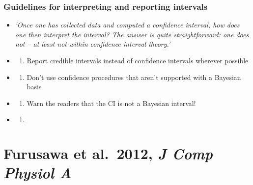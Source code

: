 \documentclass[
]{book}
\providecommand{\tightlist}{%
  \setlength{\itemsep}{0pt}\setlength{\parskip}{0pt}}
\begin{document}
\hypertarget{guidelines-for-interpreting-and-reporting-intervals}{%
\subsection{Guidelines for interpreting and reporting intervals}\label{guidelines-for-interpreting-and-reporting-intervals}}

\begin{itemize}
\item
  \emph{`Once one has collected data and computed a confidence
  interval, how does one then interpret the interval? The
  answer is quite straightforward: one does not -- at least not within confidence interval theory.'}
\item
  \begin{enumerate}
  \def\labelenumi{\arabic{enumi}.}
  \tightlist
  \item
    Report credible intervals instead of confidence intervals wherever possible
  \end{enumerate}
\item
  \begin{enumerate}
  \def\labelenumi{\arabic{enumi}.}
  \setcounter{enumi}{1}
  \tightlist
  \item
    Don't use confidence procedures that aren't supported with a Bayesian basis
  \end{enumerate}
\item
  \begin{enumerate}
  \def\labelenumi{\arabic{enumi}.}
  \setcounter{enumi}{2}
  \tightlist
  \item
    Warn the readers that the CI is not a Bayesian interval!
  \end{enumerate}
\item
  \begin{enumerate}
  \def\labelenumi{\arabic{enumi}.}
  \setcounter{enumi}{3}
  \item
  \end{enumerate}
\end{itemize}

\hypertarget{furusawa-et-al.-2012-j-comp-physiol-a}{%
\chapter{\texorpdfstring{Furusawa et al.~2012, \emph{J Comp Physiol A}}{Furusawa et al.~2012, J Comp Physiol A}}\label{furusawa-et-al.-2012-j-comp-physiol-a}}

\end{document}
